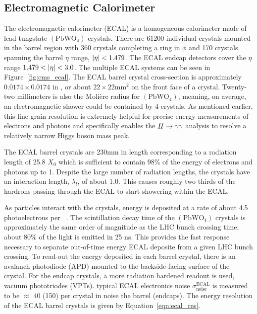 \subsection{Electromagnetic Calorimeter}
The electromagnetic calorimeter (ECAL) is a homogeneous calorimeter made of lead 
tungstate $(\textrm{PbWO}_{4})$ crystals. There are 61200 individual crystals mounted
in the barrel region with 360 crystals completing a ring in $\phi$ and 170 crystals
spanning the barrel $\eta$ range, $\lvert\eta\rvert < 1.479$. 
The ECAL endcap detectors cover the $\eta$ range $1.479 < \lvert\eta\rvert < 3.0$. The multiple
ECAL systems can be seen in Figure~\ref{fig:cms_ecal}.
The ECAL barrel crystal cross-section is approximately $0.0174 \times 0.0174$ 
in \etaphi, or about $22 \times 22 \textrm{mm}^{2}$
on the front face of a crystal. Twenty-two millimeters is also the Moli\`ere radius
for $(\textrm{PbWO}_{4})$, meaning, on average, an electromagnetic shower could be
contained by 4 crystals. As mentioned earlier, this fine grain resolution is extremely
helpful for precise energy measurements of electrons and photons and specifically
enables the $H \to \gamma\gamma$ analysis to resolve a relatively narrow Higgs
boson mass peak. 

The ECAL barrel crystals are 230mm in length corresponding to a
radiation length of 25.8 $X_{0}$ which is sufficient to contain 98\% of the energy
of electrons and photons up to 1\TeV. Despite the large number of radiation lengths,
the crystals have an interaction length, $\lambda_{l}$, of about 1.0. This causes
roughly two thirds of the hardrons passing through the ECAL to start showering
within the ECAL. 

As particles interact with the crystals, energy is deposited at a rate of about 4.5
photoelectrons per \MeV~\cite{dafinei_auffray_lecoq_schneegans_1994}.
The scintillation decay time of the $(\textrm{PbWO}_{4})$ crystals is approximately the
same order of magnitude as the LHC bunch crossing time; about 80\% of the light is emitted in 25 ns.
This provides the fast response necessary to separate out-of-time energy ECAL deposite
from a given LHC bunch crossing. To read-out the energy deposited in each barrel
crystal, there is an avalanch photodiode (APD) mounted to the backside-facing surface
of the crystal. For the endcap crystals, a more radiation hardened readout is used,
vacuum phototriodes (VPTs). typical ECAL electronics noise 
$\sigma ^{\text{ECAL}} _{\text{noise}}$ is measured to be $\approx$ 40 (150) \MeV 
per crystal in noise the barrel (endcaps).
The energy resolution of the ECAL barrel crystals is given by
Equation~\ref{eqn:ecal_res}.

